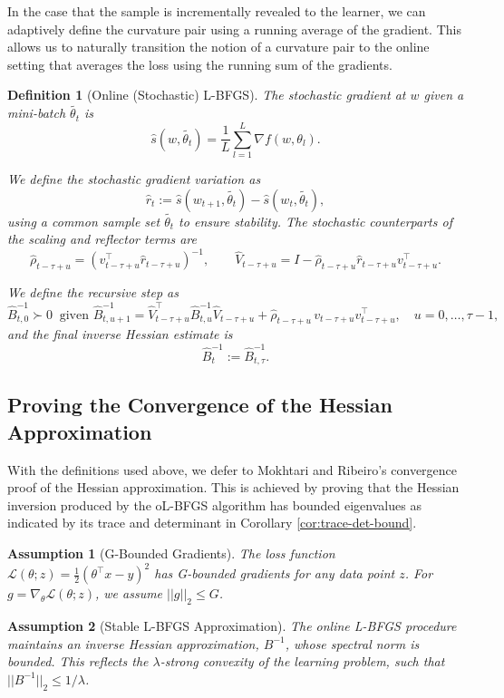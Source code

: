 \documentclass{article}
\theoremstyle{ssltheorem}
\newtheorem{assumption}{Assumption}
\newtheorem{definition}{Definition}
\begin{document}
In the case that the sample is incrementally revealed to the learner, we can adaptively define the curvature pair using a running average of the gradient.
This allows us to naturally transition the notion of a curvature pair to the online setting that averages the loss using the running sum of the gradients.
\begin{definition}[Online (Stochastic) L-BFGS]

The stochastic gradient at $w$ given a mini-batch $\tilde{\theta_{t}}$ is
$$
\hat{s}(w,\tilde{\theta_{t}}) = \frac{1}{L} \sum_{l=1}^{L} \nabla f(w,\theta_{l}).
$$

We define the stochastic gradient variation as
$$
\hat{r}_{t} := \hat{s}(w_{t+1},\tilde{\theta_{t}}) - \hat{s}(w_{t},\tilde{\theta_{t}}),
$$
using a common sample set $\tilde{\theta_{t}}$ to ensure stability.
The stochastic counterparts of the scaling and reflector terms are
$$
\hat{\rho}_{t-\tau+u} = (v_{t-\tau+u}^{\top} \hat{r}_{t-\tau+u})^{-1}, 
\qquad
\hat{V}_{t-\tau+u} = I - \hat{\rho}_{t-\tau+u} \hat{r}_{t-\tau+u} v_{t-\tau+u}^{\top}.
$$

We define the recursive step as
$$
\hat{B}^{-1}_{t,0} \succ 0 \ \text{ given }
\hat{B}^{-1}_{t,u+1} = \hat{V}_{t-\tau+u}^{\top} \hat{B}^{-1}_{t,u} \hat{V}_{t-\tau+u}
  + \hat{\rho}_{t-\tau+u}\, v_{t-\tau+u} v_{t-\tau+u}^{\top}, 
  \quad u = 0,\dots,\tau-1,
$$
and the final inverse Hessian estimate is
$$
\hat{B}^{-1}_{t} := \hat{B}^{-1}_{t,\tau}.
$$
\end{definition}

\subsection{Proving the Convergence of the Hessian Approximation}

With the definitions used above, we defer to Mokhtari and Ribeiro's convergence proof of the Hessian approximation.
This is achieved by proving that the Hessian inversion produced by the oL-BFGS algorithm has bounded eigenvalues as indicated by its trace and determinant in Corollary \ref{cor:trace-det-bound}.
\begin{assumption}[G-Bounded Gradients]
\label{assum:lipschitz}
The loss function $\mathcal{L}(\theta; z) = \frac{1}{2}(\theta^{\top} x - y)^{2}$ has G-bounded gradients for any data point $z$.
For $g = \nabla_{\theta} \mathcal{L}(\theta; z)$, we assume $||g||_{2} \leq G$.
\end{assumption}

\begin{assumption}[Stable L-BFGS Approximation]
\label{assum:stable-lbfgs}
The online L-BFGS procedure maintains an inverse Hessian approximation, $B^{-1}$, whose spectral norm is bounded.
This reflects the $\lambda$-strong convexity of the learning problem, such that $||B^{-1}||_{2} \leq 1/\lambda$.
\end{assumption}
\end{document}
